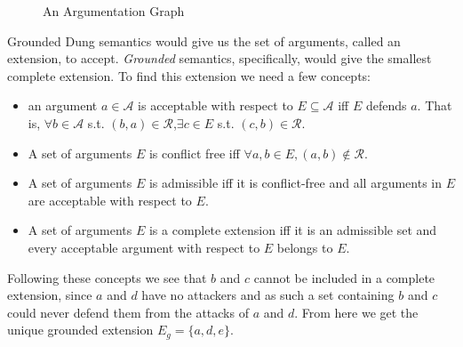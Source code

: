 \documentclass[runningheads]{llncs}
\begin{document}
\begin{example}
\begin{figure}[ht]
    \caption{An Argumentation Graph}
    \label{fig:Arg_Graph}
\end{figure}

Grounded Dung semantics \cite{DBLP:journals/ai/Dung95} would give us the set of arguments, called an extension, to accept. \textit{Grounded} semantics, specifically, would give the smallest complete extension.
To find this extension we need a few concepts:
\begin{itemize}
    \item an argument $a \in \mathcal{A}$ is acceptable with respect to $E\subseteq \mathcal{A}$ iff $E$ defends $a$. That is, $\forall b \in \mathcal{A}$ s.t. $(b,a)\in \mathcal{R}$,$\exists c \in E$ s.t. $(c,b) \in \mathcal{R}$.
    \item A set of arguments $E$ is conflict free iff $\forall a,b \in E, (a,b) \notin \mathcal{R}$.
    \item A set of arguments $E$ is admissible iff it is conflict-free and all arguments in $E$ are acceptable with respect to $E$.
    \item A set of arguments $E$ is a complete extension iff it is an admissible set and every acceptable argument with respect to $E$ belongs to $E$.
\end{itemize}
Following these concepts we see that $b$ and $c$ cannot be included in a complete extension, since $a$ and $d$ have no attackers and as such a set containing $b$ and $c$ could never defend them from the attacks of $a$ and $d$. From here we get the unique grounded extension $E_g = \{a,d,e\}$.


\end{example}
\end{document}
